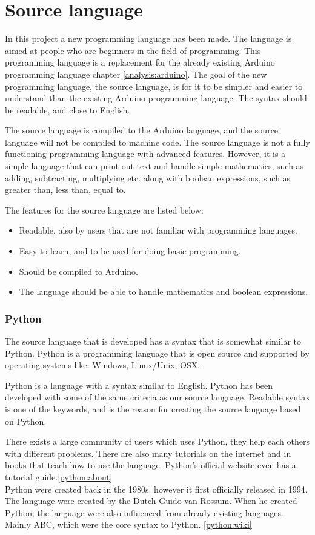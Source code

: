 \chapter{Source language}\label{analysis:source-language}
In this project a new programming language has been made. The language is aimed at people who are beginners in the field of programming. This programming language is a replacement for the already existing Arduino programming language chapter \ref{analysis:arduino}.
The goal of the new programming language, the source language, is for it to be simpler and easier to understand than the existing Arduino programming language. The syntax should be readable, and close to English.

The source language is compiled to the Arduino language, and the source language will not be compiled to machine code. The source language is not a fully functioning programming language with advanced features. However, it is a simple language that can print out text and handle simple mathematics, such as adding, subtracting, multiplying etc. along with boolean expressions, such as greater than, less than, equal to.

The features for the source language are listed below:
\begin{itemize}
	\item Readable, also by users that are not familiar with programming languages.
	\item Easy to learn, and to be used for doing basic programming.
	\item Should be compiled to Arduino.
	\item The language should be able to handle mathematics and boolean expressions.
\end{itemize}

\subsection{Python}
The source language that is developed has a syntax that is somewhat similar to Python. Python is a programming language that is open source and supported by operating systems like: Windows, Linux/Unix, OSX.

Python is a language with a syntax similar to English.
Python has been developed with some of the same criteria as our source language. Readable syntax is one of the keywords, and is the reason for creating the source language based on Python.
 
\cite{python:official:about}
There exists a large community of users which uses Python, they help each others with different problems. There are also many tutorials on the internet and in books that teach how to use the language. Python's official website even has a tutorial guide.\ref{python:about} \\
Python were created back in the 1980s. however it first officially released in 1994. The language were created by the Dutch Guido van Rossum. When he created Python, the language were also influenced from already existing languages. Mainly ABC, which were the core syntax to Python. \ref{python:wiki}